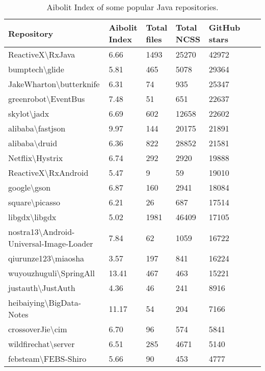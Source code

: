 \begin{table}[t]
\footnotesize
    \begin{tabular}{|l|l|l|l|l|l|l|}
    \hline
    Repository & Aibolit Index & Total files & Total NCSS & GitHub stars \\ 
    \hline
    ReactiveX\textbackslash RxJava& 6.66& 1493& 25270 & 42972  \\
    bumptech\textbackslash glide& 5.81& 465& 5078 & 29364 \\
    JakeWharton\textbackslash butterknife& 6.31& 74& 935 & 25347  \\
    greenrobot\textbackslash EventBus& 7.48& 51& 651 & 22637  \\
    skylot\textbackslash jadx& 6.69& 602& 12658 & 22602 \\
    alibaba\textbackslash fastjson & 9.97& 144& 20175 & 21891 \\
    alibaba\textbackslash druid & 6.36& 822& 28852 & 21581 \\ 
    Netflix\textbackslash Hystrix& 6.74& 292& 2920 & 19888 \\
    ReactiveX\textbackslash RxAndroid& 5.47& 9& 59 & 19010 \\
    google\textbackslash gson& 6.87& 160& 2941 & 18084 \\
    square\textbackslash picasso& 6.21& 26& 687 & 17514 \\
    libgdx\textbackslash libgdx & 5.02 & 1981 & 46409 & 17105 \\
    nostra13\textbackslash Android-Universal-Image-Loader& 7.84& 62& 1059 & 16722  \\
    qiurunze123\textbackslash miaosha& 3.57& 197& 841 & 16224 \\
    wuyouzhuguli\textbackslash SpringAll& 13.41& 467& 463 & 15221 \\
    justauth\textbackslash JustAuth& 4.36& 46& 241 & 8916 \\
    heibaiying\textbackslash BigData-Notes& 11.17& 54& 204 & 7166  \\
    crossoverJie\textbackslash cim & 6.70& 96& 574 & 5841 \\
    wildfirechat\textbackslash server& 6.51& 285& 4671  & 5140 \\
    febsteam\textbackslash FEBS-Shiro & 5.66& 90& 453 & 4777 \\
    \hline
    \end{tabular}
    \centering
\caption{Aibolit Index of some popular Java repositories. \label{table:aibolit_index_repos}}
\end{table}






